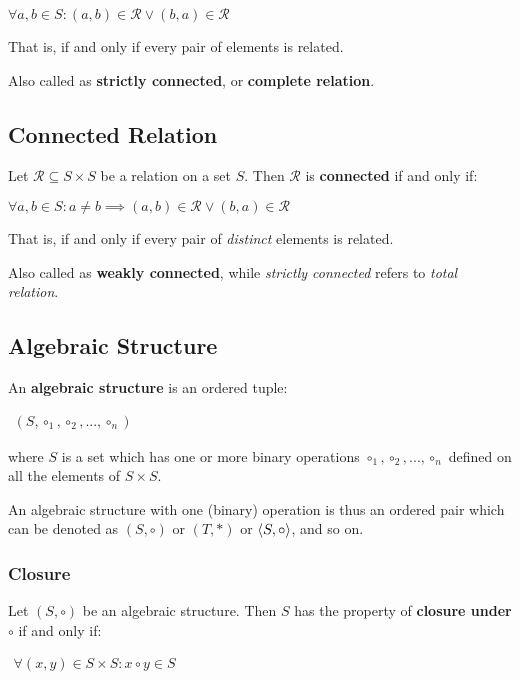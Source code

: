 $\forall a, b \in S : (a, b) \in \mathcal{R} \lor (b, a) \in
\mathcal{R}$

That is, if and only if every pair of elements is related.


Also called as \textbf{strictly connected}, or \textbf{complete
  relation}.

\subsection{Connected Relation}
\label{sec:connected-relation}

Let $\mathcal{R} \subseteq S \times S$ be a relation on a set
$S$. Then $\mathcal{R}$ is \textbf{connected} if and only if:

$\forall a, b \in S: a \neq b \implies (a, b) \in \mathcal{R} \lor
(b,a) \in \mathcal{R}$

That is, if and only if every pair of \textit{distinct} elements is
related.


Also called as \textbf{weakly connected}, while \textit{strictly
  connected} refers to \textit{total relation}.



\subsection{Algebraic Structure}

An \textbf{algebraic structure} is an ordered tuple:

\begin{math}
  \begin{array}{c}
    (S, \circ_1, \circ_2, ..., \circ_n)
  \end{array}
\end{math}

where $S$ is a set which has one or more binary operations
$\circ_1, \circ_2, ..., \circ_n$ defined on all the elements of
$S \times S$.

An algebraic structure with one (binary) operation is thus an ordered
pair which can be denoted as $(S, \circ)$ or $(T, *)$ or
$\langle S, \circ \rangle$, and so on.


\subsubsection{Closure}
Let $(S, \circ)$ be an algebraic structure. Then $S$ has the property
of \textbf{closure under $\circ$} if and only if:

\begin{math}
  \begin{array}{c}
    \forall (x, y) \in S \times S : x \circ y \in S
  \end{array}
\end{math}


